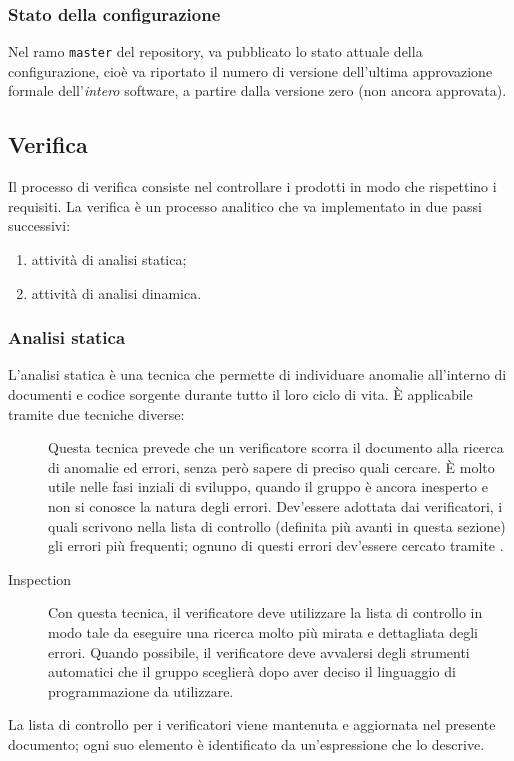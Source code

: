 \subsubsection{Stato della configurazione}
Nel ramo \texttt{master} del repository, va pubblicato lo stato attuale della configurazione, cioè va riportato il numero di versione dell'ultima approvazione formale dell'\emph{intero} software, a partire dalla versione zero (non ancora approvata).






\subsection{Verifica}
Il processo di verifica consiste nel controllare i prodotti in modo che rispettino i requisiti. %
La verifica è un processo analitico che va implementato in due passi successivi:
\begin{enumerate}
	\item attività di analisi statica;
	\item attività di analisi dinamica.
\end{enumerate}

	\subsubsection{Analisi statica}
	L'analisi statica è una tecnica che permette di individuare anomalie all'interno di documenti e codice sorgente durante tutto il loro ciclo di vita. È applicabile tramite due tecniche diverse:
	\begin{description}
		\item[] Questa tecnica prevede che un verificatore scorra il documento alla ricerca di anomalie ed errori, senza però sapere di preciso quali cercare. È molto utile nelle fasi inziali di sviluppo, quando il gruppo è ancora inesperto e non si conosce la natura degli errori. Dev'essere adottata dai verificatori, i quali scrivono nella lista di controllo (definita più avanti in questa sezione) gli errori più frequenti; ognuno di questi errori dev'essere cercato tramite .
		\item[Inspection] Con questa tecnica, il verificatore deve utilizzare la lista di controllo in modo tale da eseguire una ricerca molto più mirata e dettagliata degli errori. Quando possibile, il verificatore deve avvalersi degli strumenti automatici che il gruppo sceglierà dopo aver deciso il linguaggio di programmazione da utilizzare.
	\end{description}
	La lista di controllo per i verificatori viene mantenuta e aggiornata nel presente documento; ogni suo elemento è identificato da un'espressione che lo descrive.
